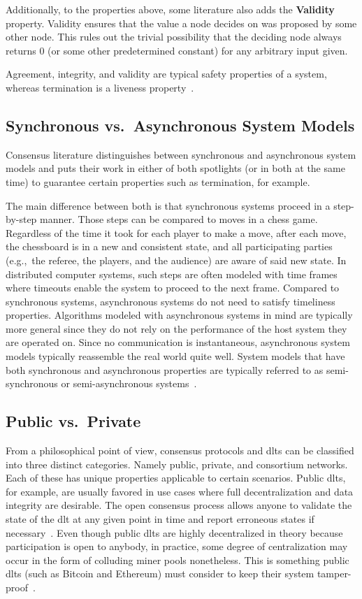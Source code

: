 Additionally, to the properties above, some literature also adds the \textbf{Validity} property. Validity ensures that the value a node decides on was proposed by some other node. This rules out the trivial possibility that the deciding node always returns 0 (or some other predetermined constant) for any arbitrary input given.

Agreement, integrity, and validity are typical safety properties of a system, whereas termination is a liveness property~\cite{kleppmann17desig}.


\subsection{Synchronous vs.\ Asynchronous System Models}
Consensus literature distinguishes between synchronous and asynchronous system models and puts their work in either of both spotlights (or in both at the same time) to guarantee certain properties such as termination, for example.

The main difference between both is that synchronous systems proceed in a step-by-step manner. Those steps can be compared to moves in a chess game. Regardless of the time it took for each player to make a move, after each move, the chessboard is in a new and consistent state, and all participating parties (e.g.,\ the referee, the players, and the audience) are aware of said new state. In distributed computer systems, such steps are often modeled with time frames where timeouts enable the system to proceed to the next frame. Compared to synchronous systems, asynchronous systems do not need to satisfy timeliness properties. Algorithms modeled with asynchronous systems in mind are typically more general since they do not rely on the performance of the host system they are operated on. Since no communication is instantaneous, asynchronous system models typically reassemble the real world quite well. System models that have both synchronous and asynchronous properties are typically referred to as semi-synchronous or semi-asynchronous systems~\cite{aguilera2010,liskov1999,kleppmann17desig}.


\subsection{Public vs.\ Private}
From a philosophical point of view, consensus protocols and \glspl{dlt} can be classified into three distinct categories. Namely public, private, and consortium networks. Each of these has unique properties applicable to certain scenarios. Public \glspl{dlt}, for example, are usually favored in use cases where full decentralization and data integrity are desirable. The open consensus process allows anyone to validate the state of the \gls{dlt} at any given point in time and report erroneous states if necessary~\cite{consensus_comparison_2019}. Even though public \glspl{dlt} are highly decentralized in theory because participation is open to anybody, in practice, some degree of centralization may occur in the form of colluding miner pools nonetheless. This is something public \glspl{dlt} (such as Bitcoin and Ethereum) must consider to keep their system tamper-proof~\cite{nakamoto2009,buterin2020,eyal2013}.

